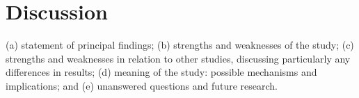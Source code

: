 \documentclass[../../main.tex]{subfiles}
\begin{document}

\chapter{Discussion}


(a) statement of principal findings; (b) strengths and weaknesses of the study; (c) strengths and weaknesses in relation to other studies, discussing particularly any differences in results; (d) meaning of the study: possible mechanisms and implications; and (e) unanswered questions and future research.

\end{document}
